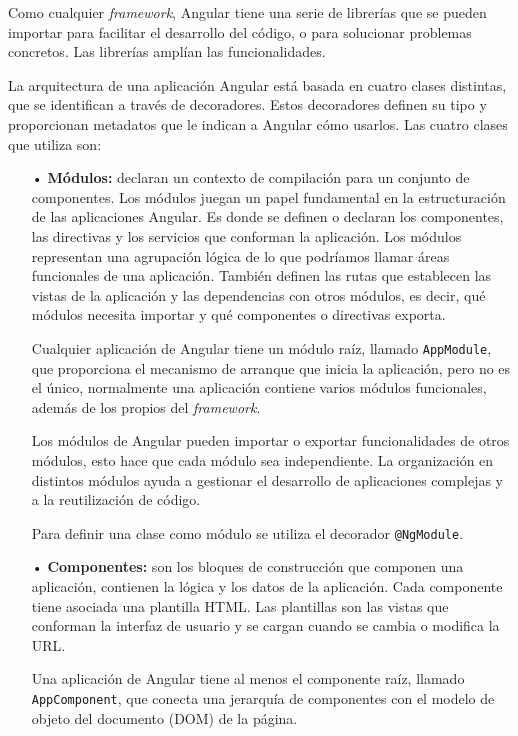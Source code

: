 \documentclass[a4paper, 12pt]{book}
\begin{document}
Como cualquier \emph{framework}, Angular tiene una serie de librerías que se pueden importar para facilitar el desarrollo del código, o para solucionar problemas concretos. 
Las librerías amplían las funcionalidades.

La arquitectura de una aplicación Angular está basada en cuatro clases distintas, que se identifican a través de decoradores. 
Estos decoradores definen su tipo y proporcionan metadatos que le indican a Angular cómo usarlos.
Las cuatro clases que utiliza son:

\begin{itemize}

	\item[•] \textbf{Módulos:} declaran un contexto de compilación para un conjunto de componentes. 
	Los módulos juegan un papel fundamental en la estructuración de las aplicaciones Angular. 
	Es donde se definen o declaran los componentes, las directivas y los servicios que conforman la aplicación. 
	Los módulos representan una agrupación lógica de lo que podríamos llamar áreas funcionales de una aplicación. 
	También definen las rutas que establecen las vistas de la aplicación y las dependencias con otros módulos, es decir, qué módulos necesita importar y qué componentes o directivas exporta. 
	
	Cualquier aplicación de Angular tiene un módulo raíz, llamado \texttt{AppModule}, que proporciona el mecanismo de arranque que inicia la aplicación, pero no es el único, normalmente una aplicación contiene varios módulos funcionales, además de los propios del \emph{framework}. 
	
	Los módulos de Angular pueden importar o exportar funcionalidades de otros módulos, esto hace que cada módulo sea independiente. 
	La organización en distintos módulos ayuda a gestionar el desarrollo de aplicaciones complejas y a la reutilización de código.
	
	Para definir una clase como módulo se utiliza el decorador \texttt{@NgModule}.
	
	\item[•] \textbf{Componentes:} son los bloques de construcción que componen una aplicación, contienen la lógica y los datos de la aplicación. 
	Cada componente tiene asociada una plantilla HTML. Las plantillas son las vistas que conforman la interfaz de usuario y se cargan cuando se cambia o modifica la URL.
	
	Una aplicación de Angular tiene al menos el componente raíz, llamado \texttt{AppComponent}, que conecta una jerarquía de componentes con el modelo de objeto del documento (DOM) de la página.
	

\end{itemize}
\end{document}
